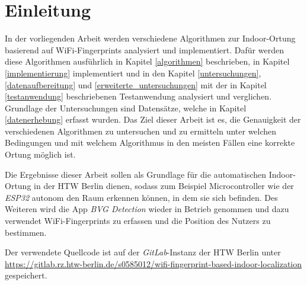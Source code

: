 \chapter{Einleitung}

In der vorliegenden Arbeit werden verschiedene Algorithmen zur Indoor-Ortung basierend auf WiFi-Fingerprints analysiert und implementiert. Dafür werden diese Algorithmen ausführlich in Kapitel \ref{algorithmen} beschrieben, in Kapitel \ref{implementierung} implementiert und in den Kapitel \ref{untersuchungen}, \ref{datenaufbereitung} und \ref{erweiterte_untersuchungen} mit der in Kapitel \ref{testanwendung} beschriebenen Testanwendung analysiert und verglichen. Grundlage der Untersuchungen sind Datensätze, welche in Kapitel \ref{datenerhebung} erfasst wurden. Das Ziel dieser Arbeit ist es, die Genauigkeit der verschiedenen Algorithmen zu untersuchen und zu ermitteln unter welchen Bedingungen und mit welchem Algorithmus in den meisten Fällen eine korrekte Ortung möglich ist. 

Die Ergebnisse dieser Arbeit sollen als Grundlage für die automatischen Indoor-Ortung in der HTW Berlin dienen, sodass zum Beispiel Microcontroller wie der \textit{ESP32} autonom den Raum erkennen können, in dem sie sich befinden. Des Weiteren wird die App \textit{BVG Detection} wieder in Betrieb genommen und dazu verwendet WiFi-Fingerprints zu erfassen und die Position des Nutzers zu bestimmen.

Der verwendete Quellcode ist auf der \textit{GitLab}-Instanz der HTW Berlin unter \url{https://gitlab.rz.htw-berlin.de/s0585012/wifi-fingerprint-based-indoor-localization} gespeichert.
